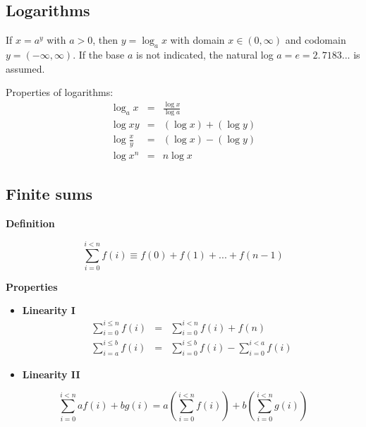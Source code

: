 \documentclass[justified,sixbynine]{tufte-book}
\def\subsubsection#1{{\bf #1}}
\theoremstyle{plain}%
\theoremstyle{definition}
\theoremstyle{remark}
\begin{document}
\begin{fullwidth}
\goodbreak\subsection{Logarithms}

If $x=a^y$ with $a>0$, then $y=\log _ax$ with domain $x\in (0,\infty )$ and
codomain $y=(-\infty ,\infty )$. If the base $a$ is not indicated, the
natural log $a=e=\allowbreak 2.\,7183...$ is assumed.

Properties of logarithms:
\begin{eqnarray}
\log _ax &=&\frac{\log x}{\log a} \\
\log xy &=&(\log x)+(\log y) \\
\log \frac xy &=&(\log x)-(\log y) \\
\log x^n &=&n\log x
\end{eqnarray}

\goodbreak\subsection{Finite sums}

\subsubsection{Definition}

\begin{equation}
\sum_{i=0}^{i<n}f(i)\equiv f(0)+f(1)+...+f(n-1)
\end{equation}

\subsubsection{Properties}

\begin{itemize}
\item  {\bf Linearity I}
\begin{eqnarray}
\sum_{i=0}^{i\leq n}f(i) &=&\sum_{i=0}^{i<n}f(i)+f(n) \\
\sum_{i=a}^{i\leq b}f(i) &=&\sum_{i=0}^{i\leq b}f(i)-\sum_{i=0}^{i<a}f(i)
\end{eqnarray}

\item  {\bf Linearity II}
\end{itemize}

\begin{equation}
\sum_{i=0}^{i<n}af(i)+bg(i)=a\left( \sum_{i=0}^{i<n}f(i)\right) +b\left(
\sum_{i=0}^{i<n}g(i)\right)
\end{equation}


\end{fullwidth}
\end{document}
